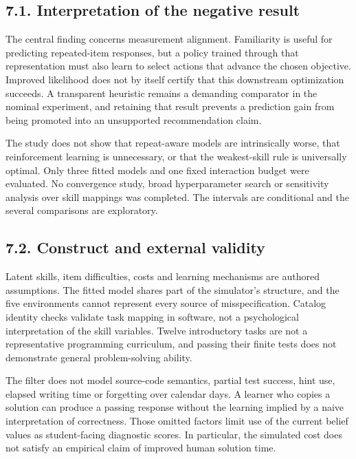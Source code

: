 \documentclass[preprint,11pt,authoryear]{elsarticle}
\begin{document}
\subsection*{7.1. Interpretation of the negative result}

The central finding concerns measurement alignment. Familiarity is useful for predicting repeated-item responses, but a policy trained through that representation must also learn to select actions that advance the chosen objective. Improved likelihood does not by itself certify that this downstream optimization succeeds. A transparent heuristic remains a demanding comparator in the nominal experiment, and retaining that result prevents a prediction gain from being promoted into an unsupported recommendation claim.

The study does not show that repeat-aware models are intrinsically worse, that reinforcement learning is unnecessary, or that the weakest-skill rule is universally optimal. Only three fitted models and one fixed interaction budget were evaluated. No convergence study, broad hyperparameter search or sensitivity analysis over skill mappings was completed. The intervals are conditional and the several comparisons are exploratory.

\subsection*{7.2. Construct and external validity}

Latent skills, item difficulties, costs and learning mechanisms are authored assumptions. The fitted model shares part of the simulator's structure, and the five environments cannot represent every source of misspecification. Catalog identity checks validate task mapping in software, not a psychological interpretation of the skill variables. Twelve introductory tasks are not a representative programming curriculum, and passing their finite tests does not demonstrate general problem-solving ability.

The filter does not model source-code semantics, partial test success, hint use, elapsed writing time or forgetting over calendar days. A learner who copies a solution can produce a passing response without the learning implied by a naive interpretation of correctness. Those omitted factors limit use of the current belief values as student-facing diagnostic scores. In particular, the simulated cost does not satisfy an empirical claim of improved human solution time.
\end{document}
